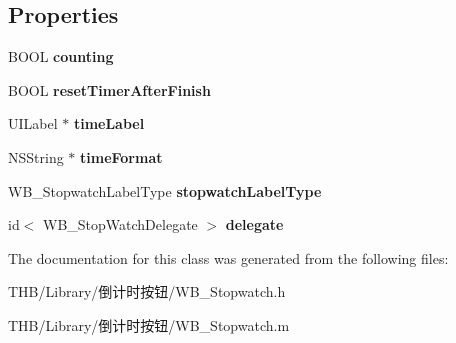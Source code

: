 \subsection*{Properties}
\begin{DoxyCompactItemize}
\item 
\mbox{\label{interface_w_b___stopwatch_a9a00948d13379bed1b5b987178d996ca}} 
B\+O\+OL {\bfseries counting}
\item 
\mbox{\label{interface_w_b___stopwatch_a71d6191b45726e6b3495b6726515d3f7}} 
B\+O\+OL {\bfseries reset\+Timer\+After\+Finish}
\item 
\mbox{\label{interface_w_b___stopwatch_a4c33e99b815758fba3b346cc0f636fd1}} 
U\+I\+Label $\ast$ {\bfseries time\+Label}
\item 
\mbox{\label{interface_w_b___stopwatch_a13def523acf443b7408887710cbe0aa0}} 
N\+S\+String $\ast$ {\bfseries time\+Format}
\item 
\mbox{\label{interface_w_b___stopwatch_aabb50bdc88d0050b44fb04b74bebd887}} 
W\+B\+\_\+\+Stopwatch\+Label\+Type {\bfseries stopwatch\+Label\+Type}
\item 
\mbox{\label{interface_w_b___stopwatch_a36cdf2141b3f5fec352f191803f99906}} 
id$<$ W\+B\+\_\+\+Stop\+Watch\+Delegate $>$ {\bfseries delegate}
\end{DoxyCompactItemize}


The documentation for this class was generated from the following files\+:\begin{DoxyCompactItemize}
\item 
T\+H\+B/\+Library/倒计时按钮/W\+B\+\_\+\+Stopwatch.\+h\item 
T\+H\+B/\+Library/倒计时按钮/W\+B\+\_\+\+Stopwatch.\+m\end{DoxyCompactItemize}
